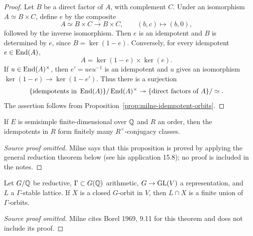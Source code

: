 \begin{proof}
Let $B$ be a direct factor of $A$, with complement $C$.  Under an isomorphism
$A\simeq B\times C$, define $e$ by the composite
\[
A\simeq B\times C\longrightarrow B\times C,
\qquad (b,c)\longmapsto(b,0),
\]
followed by the inverse isomorphism.  Then $e$ is an idempotent and $B$ is
determined by $e$, since $B=\ker(1-e)$.  Conversely, for every idempotent
$e\in\operatorname{End}(A)$,
\[
A=\ker(1-e)\times\ker(e).
\]
If $u\in\operatorname{End}(A)^\times$, then $e'=ueu^{-1}$ is an idempotent and $u$ gives
an isomorphism $\ker(1-e)\to\ker(1-e')$.  Thus there is a surjection
\[
\{\text{idempotents in }\operatorname{End}(A)\}/\operatorname{End}(A)^\times
\twoheadrightarrow
\{\text{direct factors of }A\}/\simeq.
\]
The assertion follows from Proposition~\ref{prop:milne-idempotent-orbits}.
\end{proof}

\begin{proposition}\label{prop:milne-idempotent-orbits}
If $E$ is semisimple finite-dimensional over $\mathbb{Q}$ and $R$ an order, then the idempotents in $R$ form finitely many $R^\times$-conjugacy classes.
\end{proposition}
\begin{proof}[Source proof omitted]
Milne says that this proposition is proved by applying the general reduction
theorem below (see his application 15.8); no proof is included in the notes.
\end{proof}
\begin{theorem}\label{thm:milne-bhc-orbit}
Let $G/\mathbb{Q}$ be reductive, $\Gamma\subset G(\mathbb{Q})$ arithmetic, $G\to\operatorname{GL}(V)$ a representation, and $L$ a $\Gamma$-stable lattice. If $X$ is a closed $G$-orbit in $V$, then $L\cap X$ is a finite union of $\Gamma$-orbits.
\end{theorem}
\begin{proof}[Source proof omitted]
Milne cites Borel 1969, 9.11 for this theorem and does not include its proof.
\end{proof}
